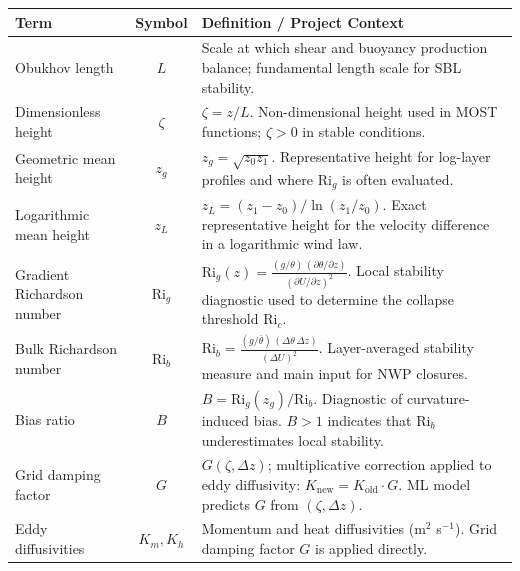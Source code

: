 \begin{table}[t]
\centering
\renewcommand{\arraystretch}{1.25}
\begin{tabularx}{\linewidth}{l c X}
\hline
\textbf{Term} & \textbf{Symbol} & \textbf{Definition / Project Context} \\
\hline

Obukhov length
 & $L$
 & Scale at which shear and buoyancy production balance; fundamental length scale for SBL stability. \\

Dimensionless height
 & $\zeta$
 & $\zeta = z/L$. Non-dimensional height used in MOST functions; $\zeta>0$ in stable conditions. \\

Geometric mean height
 & $z_g$
 & $z_g = \sqrt{z_0 z_1}$. Representative height for log-layer profiles and where $\mathrm{Ri}_g$ is often evaluated. \\

Logarithmic mean height
 & $z_L$
 & $z_L = (z_1 - z_0) / \ln(z_1 / z_0)$. Exact representative height for the velocity difference in a logarithmic wind law. \\

Gradient Richardson number
 & $\mathrm{Ri}_g$
 & $\displaystyle \mathrm{Ri}_g(z)=\frac{(g/\theta)\,(\partial\theta/\partial z)}{(\partial U/\partial z)^2}$. Local stability diagnostic used to determine the collapse threshold $\mathrm{Ri}_c$. \\

Bulk Richardson number
 & $\mathrm{Ri}_b$
 & $\displaystyle \mathrm{Ri}_b=\frac{(g/\bar{\theta})\,(\Delta\theta\,\Delta z)}{(\Delta U)^2}$. Layer-averaged stability measure and main input for NWP closures. \\

Bias ratio
 & $B$
 & $B = \mathrm{Ri}_g(z_g) / \mathrm{Ri}_b$. Diagnostic of curvature-induced bias. $B>1$ indicates that $\mathrm{Ri}_b$ underestimates local stability. \\

Grid damping factor
 & $G$
 & $G(\zeta,\Delta z)$; multiplicative correction applied to eddy diffusivity: $K_{\text{new}} = K_{\text{old}} \cdot G$. ML model predicts $G$ from $(\zeta,\Delta z)$. \\

Eddy diffusivities
 & $K_m, K_h$
 & Momentum and heat diffusivities (m$^2$ s$^{-1}$). Grid damping factor $G$ is applied directly. \\


\end{tabularx}
\end{table}

